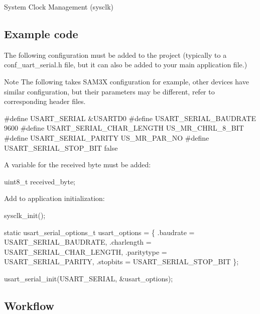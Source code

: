 \begin{DoxyEnumerate}
\item System Clock Management (sysclk)
\end{DoxyEnumerate}\hypertarget{serial_quickstart_serial_basic_use_case_setup_code}{}\subsection{Example code}\label{serial_quickstart_serial_basic_use_case_setup_code}
The following configuration must be added to the project (typically to a conf\+\_\+uart\+\_\+serial.\+h file, but it can also be added to your main application file.)

\begin{DoxyNote}{Note}
The following takes S\+A\+M3\+X configuration for example, other devices have similar configuration, but their parameters may be different, refer to corresponding header files.
\end{DoxyNote}

\begin{DoxyCode}
\textcolor{preprocessor}{#define USART\_SERIAL                     &USARTD0}
\textcolor{preprocessor}{#define USART\_SERIAL\_BAUDRATE            9600}
\textcolor{preprocessor}{#define USART\_SERIAL\_CHAR\_LENGTH         US\_MR\_CHRL\_8\_BIT}
\textcolor{preprocessor}{#define USART\_SERIAL\_PARITY              US\_MR\_PAR\_NO}
\textcolor{preprocessor}{#define USART\_SERIAL\_STOP\_BIT            false}
\end{DoxyCode}


A variable for the received byte must be added\+: 
\begin{DoxyCode}
uint8\_t received\_byte; 
\end{DoxyCode}


Add to application initialization\+: 
\begin{DoxyCode}
sysclk\_init();

\textcolor{keyword}{static} usart\_serial\_options\_t usart\_options = \{
   .baudrate = USART\_SERIAL\_BAUDRATE,
   .charlength = USART\_SERIAL\_CHAR\_LENGTH,
   .paritytype = USART\_SERIAL\_PARITY,
   .stopbits = USART\_SERIAL\_STOP\_BIT
\};

usart\_serial\_init(USART\_SERIAL, &usart\_options);
\end{DoxyCode}
\hypertarget{serial_quickstart_serial_basic_use_case_setup_flow}{}\subsection{Workflow}\label{serial_quickstart_serial_basic_use_case_setup_flow}

